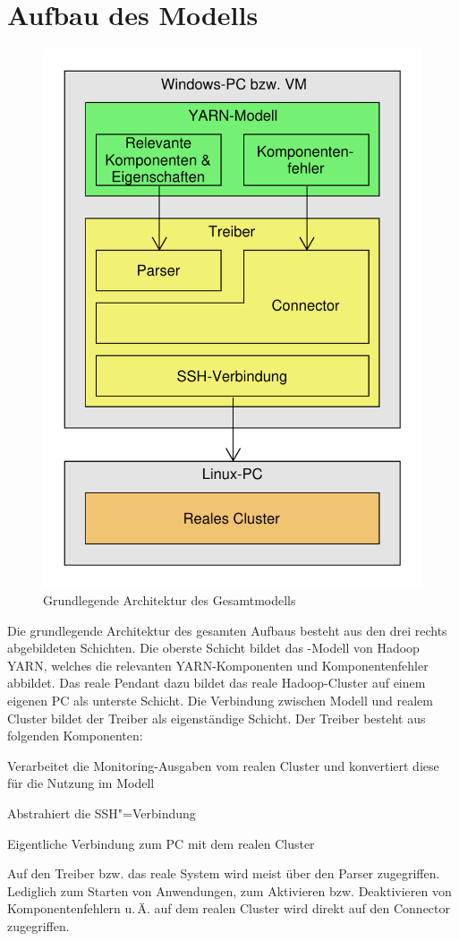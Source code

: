 \chapter{Aufbau des Modells}\label{chap:modell}

\begin{figure}
    \centering
    \includegraphics[width=0.5\columnwidth]{./images/modelArchitecture.pdf}
    \caption{Grundlegende Architektur des Gesamtmodells}
    \label{fig:modelArchitecture}
\end{figure}

Die grundlegende Architektur des gesamten Aufbaus besteht aus den drei rechts abgebildeten Schichten. Die oberste Schicht bildet das \sS-Modell von Hadoop YARN, welches die relevanten YARN-Komponenten und Komponentenfehler abbildet. Das reale Pendant dazu bildet das reale Hadoop-Cluster auf einem eigenen PC als unterste Schicht. Die Verbindung zwischen Modell und realem Cluster bildet der Treiber als eigenständige Schicht. Der Treiber besteht aus folgenden Komponenten:

\begin{description}[noitemsep]
    \item [Parser] Verarbeitet die Monitoring-Ausgaben vom realen Cluster und konvertiert diese für die Nutzung im Modell
    \item [Connector] Abstrahiert die SSH"=Verbindung
    \item [SSH-Verbindung] Eigentliche Verbindung zum PC mit dem realen Cluster
\end{description}

Auf den Treiber bzw. das reale System wird meist über den Parser zugegriffen. Lediglich zum Starten von Anwendungen, zum Aktivieren bzw. Deaktivieren von Komponentenfehlern u.\,Ä. auf dem realen Cluster wird direkt auf den Connector zugegriffen.

%



